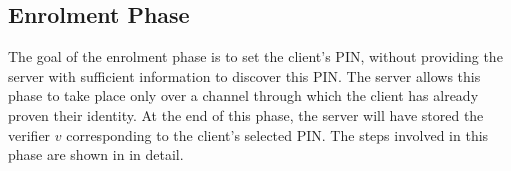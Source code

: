 \documentclass[runningheads]{llncs}
\renewcommand{\verifier}{\ensuremath{{v}}}
\begin{document}
\vspace{-8mm}
\subsection{Enrolment Phase}
\label{sec:enrollment}

The goal of the enrolment phase is to set the client's PIN, without providing the  
 server with sufficient information to discover this PIN. The server allows this phase to take place only over a channel through which the client has already proven their identity.  At the end of this phase, the server will have stored the verifier $\verifier$ corresponding to the client's selected PIN.
The steps involved in this phase are shown in  in detail.  
\end{document}
